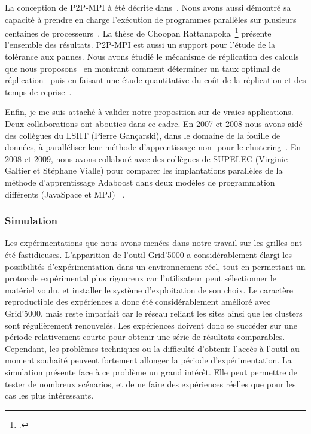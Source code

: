 \documentclass[11pt]{article}
\newcommand{\pmpi}{\mbox{\textsc{P2P-MPI}}}
\begin{document}
La conception de {\pmpi}  à été décrite dans~\cite{icps-2007-182,icps-2005-155}.
Nous  avons aussi  démontré  sa  capacité à  prendre  en  charge l'exécution  de
programmes       parallèles        sur       plusieurs        centaines       de
processeurs~\cite{icps-2008-193}.        La        thèse       de        Choopan
Rattanapoka~\footcite{icps-2008-208} présente l'ensemble  des résultats. {\pmpi}
est aussi un support pour l'étude de  la tolérance aux pannes. Nous avons étudié
le mécanisme de réplication  des calculs que nous proposons~\cite{icps-2007-185}
en     montrant      comment     déterminer      un     taux      optimal     de
réplication~\cite{icps-2009-217} puis en faisant  une étude quantitative du coût
de la réplication et des temps de reprise~\cite{icps-2009-214}.

Enfin,  je  me   suis  attaché  à  valider  notre  proposition   sur  de  vraies
applications. Deux  collaborations ont abouties dans  ce cadre. En 2007  et 2008
nous avons aidé des collègues du LSIIT (Pierre Gançarski), dans le domaine de la
fouille de données, à paralléliser leur méthode d'apprentissage non-%
pour le clustering~\cite{icps-2008-188}.  En 2008 et 2009,  nous avons collaboré
avec  des  collègues de  SUPELEC  (Virginie  Galtier  et Stéphane  Vialle)  pour
comparer  les implantations  parallèles de  la méthode  d'apprentissage Adaboost
dans   deux   modèles  de   programmation   différents   (JavaSpace  et   MPJ)~%
\cite{icps-2009-219}.


\subsubsection{Simulation}
\label{sc:simulation}

Les expérimentations  que nous avons menées  dans notre travail sur  les grilles
ont  été  fastidieuses. L'apparition  de  l'outil  Grid'5000 a  considérablement
élargi les  possibilités d'expérimentation dans  un environnement réel,  tout en
permettant  un  protocole expérimental  plus  rigoureux  car l'utilisateur  peut
sélectionner le  matériel voulu, et  installer le système d'exploitation  de son
choix. Le  caractère reproductible des  expériences a donc  été considérablement
amélioré avec  Grid'5000, mais reste imparfait  car le réseau reliant  les sites
ainsi que les  clusters sont régulièrement renouvelés.   Les expériences doivent
donc se succéder  sur une période relativement courte pour  obtenir une série de
résultats  comparables. Cependant,  les  problèmes techniques  ou la  difficulté
d'obtenir l'accès  à l'outil  au moment souhaité  peuvent fortement  allonger la
période d'expérimentation.  La  simulation présente face à ce  problème un grand
intérêt. Elle peut permettre de tester de nombreux scénarios, et de ne faire des
expériences réelles que pour les cas les plus intéressants.\\
\end{document}
